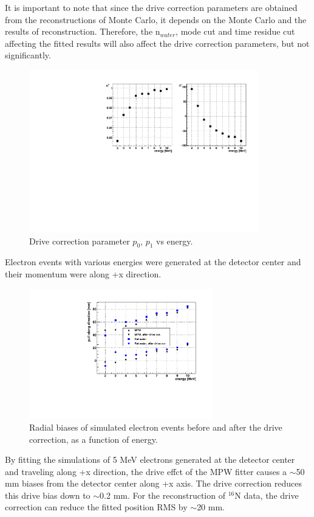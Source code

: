 It is important to note that since the drive correction parameters are obtained from the reconstructions of Monte Carlo, it depends on the Monte Carlo and the results of reconstruction. Therefore, the n$_{water}$, mode cut and time residue cut affecting the fitted results will also affect the drive correction parameters, but not significantly.


\begin{figure}[!htb]
	\centering
	\includegraphics[width=10cm]{pullParVsEnergy.pdf}
	\caption{ Drive correction parameter $p_0$, $p_1$ vs energy.}
	\label{pullParVsEnergy}
\end{figure}

Electron events with various energies were generated at the detector center and their momentum were along +x direction. 

\begin{figure}[!htb]
	\centering
	\includegraphics[width=8cm]{pullEffectVsEnergy.pdf}
	\caption{ Radial biases of simulated electron events before and after the drive correction, as a function of energy.}
	\label{drivecorVsEnergy}
\end{figure}


By fitting the simulations of 5 MeV electrons generated at the detector center and traveling along +x direction, the drive effct of the MPW fitter causes a $\sim$50 mm biases from the detector center along +x axis. The drive correction reduces this drive bias down to $\sim$0.2 mm. For the reconstruction of $^{16}$N data, the drive correction can reduce the fitted position RMS by $\sim$20 mm.

